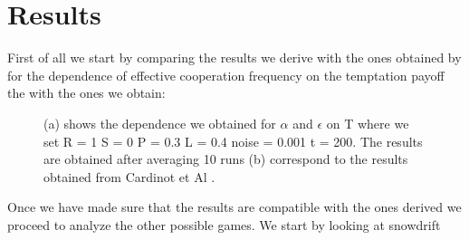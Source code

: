 \documentclass[12pt,oneside,a4paper,fleqn]{article}
\begin{document}
\section{Results}
First of all we start by comparing the results we derive with the ones obtained by \cite{cardinot2018} for the dependence of effective cooperation frequency on the temptation payoff the with the ones we obtain: 
\begin{figure}[H]
    \centering
    \caption{(a) shows the dependence we obtained for $\alpha$ and $\epsilon$ on T where we set R = 1 S = 0 P = 0.3 L = 0.4 noise = 0.001 t = 200. The results are obtained after averaging 10 runs (b) correspond to the results obtained from Cardinot et Al \cite{cardinot2018}.}
    \label{fig: comparison of epsilon and alpha}
\end{figure}
Once we have made sure that the results are compatible with the ones derived we proceed to analyze the other possible games. We start by looking at snowdrift 
\end{document}
